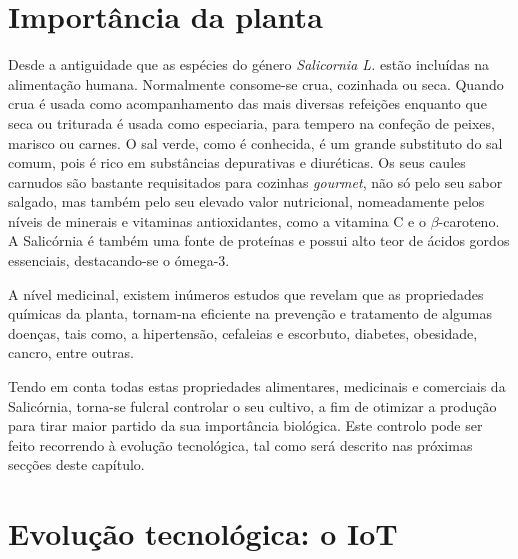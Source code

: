 \section{Importância da planta}



Desde a antiguidade que as espécies do género \textit{Salicornia L.} estão incluídas na alimentação humana. Normalmente consome-se crua, cozinhada ou seca. Quando crua é usada como acompanhamento das mais diversas refeições enquanto que seca ou triturada é usada como especiaria, para tempero na confeção de peixes, marisco ou carnes. O sal verde, como é conhecida, é um grande substituto do sal comum, pois é rico em substâncias depurativas e diuréticas. Os seus caules carnudos são bastante requisitados para cozinhas \textit{gourmet}, não só pelo seu sabor salgado, mas também pelo seu elevado valor nutricional\cite{Filomena2009}, nomeadamente pelos níveis de minerais e vitaminas antioxidantes, como a  vitamina C e o $\beta$-caroteno. A Salicórnia é também uma fonte de proteínas e possui alto teor de ácidos gordos essenciais, destacando-se o  ómega-3\cite{Ventura2011}. 

A nível medicinal, existem inúmeros estudos que revelam que as propriedades químicas da planta, tornam-na eficiente na prevenção e tratamento de algumas doenças, tais como, a hipertensão, cefaleias e escorbuto, diabetes, obesidade, cancro, entre outras\cite{Wang2012}.

Tendo em conta todas estas propriedades alimentares, medicinais e comerciais da Salicórnia, torna-se fulcral controlar o seu cultivo, a fim de otimizar a produção para tirar maior partido da sua importância biológica. Este controlo pode ser feito recorrendo à evolução tecnológica, tal como será descrito nas próximas secções deste capítulo. 




















\section{Evolução tecnológica: o \acl{IoT}}


